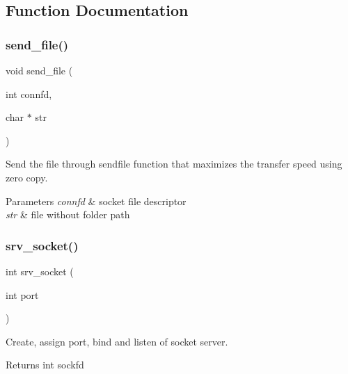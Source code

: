 \subsection{Function Documentation}
\mbox{\label{socket__server_8c_a5f68249c4a06c39600eba28ae2a2f061}} 
\subsubsection{send\+\_\+file()}
{\footnotesize\ttfamily void send\+\_\+file (\begin{DoxyParamCaption}\item[{int}]{connfd,  }\item[{char $\ast$}]{str }\end{DoxyParamCaption})}



Send the file through sendfile function that maximizes the transfer speed using zero copy. 


\begin{DoxyParams}{Parameters}
{\em connfd} & socket file descriptor \\
\hline
{\em str} & file without folder path \\
\hline
\end{DoxyParams}
\mbox{\label{socket__server_8c_a8c5fec800b50ceb5bb108fb72a4b50b1}} 
\subsubsection{srv\+\_\+socket()}
{\footnotesize\ttfamily int srv\+\_\+socket (\begin{DoxyParamCaption}\item[{int}]{port }\end{DoxyParamCaption})}



Create, assign port, bind and listen of socket server. 

\begin{DoxyReturn}{Returns}
int sockfd 
\end{DoxyReturn}
\mbox{\label{socket__server_8c_ad26b08974642b47dc5bf48289824f655}} 
